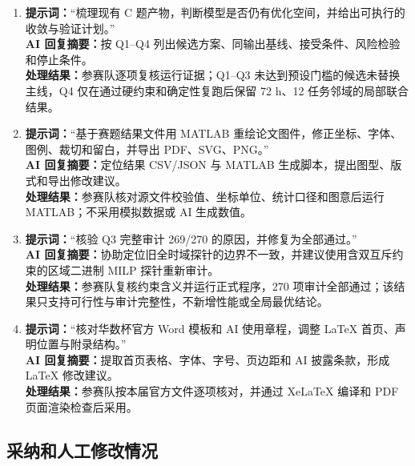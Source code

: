 \begin{enumerate}[label=\textbf{交互记录 \arabic*.},leftmargin=2.2em]
  \item \textbf{提示词：}“梳理现有 C 题产物，判断模型是否仍有优化空间，并给出可执行的收敛与验证计划。”\\
  \textbf{AI 回复摘要：}按 Q1--Q4 列出候选方案、同输出基线、接受条件、风险检验和停止条件。\\
  \textbf{处理结果：}参赛队逐项复核运行证据；Q1--Q3 未达到预设门槛的候选未替换主线，Q4 仅在通过硬约束和确定性复跑后保留 72 h、12 任务邻域的局部联合结果。

  \item \textbf{提示词：}“基于赛题结果文件用 MATLAB 重绘论文图件，修正坐标、字体、图例、裁切和留白，并导出 PDF、SVG、PNG。”\\
  \textbf{AI 回复摘要：}定位结果 CSV/JSON 与 MATLAB 生成脚本，提出图型、版式和导出修改建议。\\
  \textbf{处理结果：}参赛队核对源文件校验值、坐标单位、统计口径和图意后运行 MATLAB；不采用模拟数据或 AI 生成数值。

  \item \textbf{提示词：}“核验 Q3 完整审计 269/270 的原因，并修复为全部通过。”\\
  \textbf{AI 回复摘要：}协助定位旧全时域探针的边界不一致，并建议使用含双互斥约束的区域二进制 MILP 探针重新审计。\\
  \textbf{处理结果：}参赛队复核约束含义并运行正式程序，270 项审计全部通过；该结果只支持可行性与审计完整性，不新增性能或全局最优结论。

  \item \textbf{提示词：}“核对华数杯官方 Word 模板和 AI 使用章程，调整 LaTeX 首页、声明位置与附录结构。”\\
  \textbf{AI 回复摘要：}提取首页表格、字体、字号、页边距和 AI 披露条款，形成 LaTeX 修改建议。\\
  \textbf{处理结果：}参赛队按本届官方文件逐项核对，并通过 XeLaTeX 编译和 PDF 页面渲染检查后采用。
\end{enumerate}

\subsection{采纳和人工修改情况}

